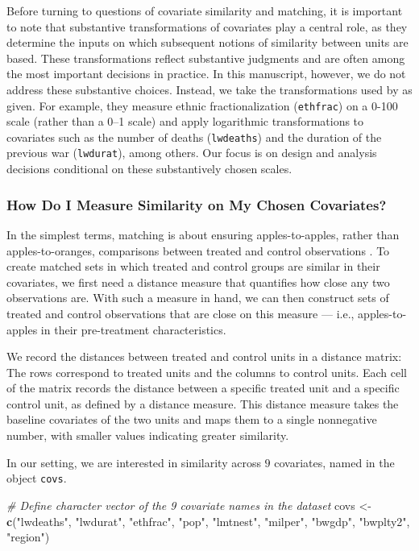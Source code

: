 \documentclass[
  12pt,
  leqno]{article}
\newenvironment{Shaded}{\begin{snugshade}}{\end{snugshade}}
\newcommand{\CommentTok}[1]{\textcolor[rgb]{0.56,0.35,0.01}{\textit{#1}}}
\newcommand{\FunctionTok}[1]{\textcolor[rgb]{0.13,0.29,0.53}{\textbf{#1}}}
\newcommand{\NormalTok}[1]{#1}
\newcommand{\OtherTok}[1]{\textcolor[rgb]{0.56,0.35,0.01}{#1}}
\newcommand{\StringTok}[1]{\textcolor[rgb]{0.31,0.60,0.02}{#1}}
\begin{document}
Before turning to questions of covariate similarity and matching, it is
important to note that substantive transformations of covariates play a
central role, as they determine the inputs on which subsequent notions
of similarity between units are based. These transformations reflect
substantive judgments and are often among the most important decisions
in practice. In this manuscript, however, we do not address these
substantive choices. Instead, we take the transformations used by
\citet{gilligansergenti2008} as given. For example, they measure ethnic
fractionalization (\texttt{ethfrac}) on a 0-100 scale (rather than a
0--1 scale) and apply logarithmic transformations to covariates such as
the number of deaths (\texttt{lwdeaths}) and the duration of the
previous war (\texttt{lwdurat}), among others. Our focus is on design
and analysis decisions conditional on these substantively chosen scales.

\subsubsection{How Do I Measure Similarity on My Chosen
Covariates?}\label{how-do-i-measure-similarity-on-my-chosen-covariates}

In the simplest terms, matching is about ensuring apples-to-apples,
rather than apples-to-oranges, comparisons between treated and control
observations \citep{rubinwaterman2006}. To create matched sets in which
treated and control groups are similar in their covariates, we first
need a distance measure that quantifies how close any two observations
are. With such a measure in hand, we can then construct sets of treated
and control observations that are close on this measure --- i.e.,
apples-to-apples in their pre-treatment characteristics.

We record the distances between treated and control units in a distance
matrix: The rows correspond to treated units and the columns to control
units. Each cell of the matrix records the distance between a specific
treated unit and a specific control unit, as defined by a distance
measure. This distance measure takes the baseline covariates of the two
units and maps them to a single nonnegative number, with smaller values
indicating greater similarity.

In our setting, we are interested in similarity across \(9\) covariates,
named in the object \texttt{covs}.

\singlespacing

\begin{Shaded}
\begin{Highlighting}[]
\CommentTok{\# Define character vector of the 9 covariate names in the dataset}
\NormalTok{covs }\OtherTok{\textless{}{-}} \FunctionTok{c}\NormalTok{(}\StringTok{"lwdeaths"}\NormalTok{, }\StringTok{"lwdurat"}\NormalTok{, }\StringTok{"ethfrac"}\NormalTok{, }\StringTok{"pop"}\NormalTok{, }\StringTok{"lmtnest"}\NormalTok{, }\StringTok{"milper"}\NormalTok{,}
          \StringTok{"bwgdp"}\NormalTok{, }\StringTok{"bwplty2"}\NormalTok{, }\StringTok{"region"}\NormalTok{)}
\end{Highlighting}
\end{Shaded}
\end{document}
